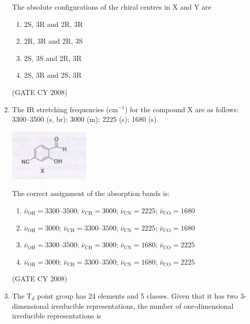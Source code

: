\documentclass[12pt]{article}
\begin{document}
\begin{enumerate}
 The absolute configurations of the chiral centres in X and Y are

\begin{enumerate}
\item  2S, 3R  and  2R, 3R 
\item  2R, 3R  and  2R, 3S 
\item  2S, 3S  and  2R, 3R 
\item  2S, 3R  and  2S, 3R
\end{enumerate}    \hfill{(GATE CY 2008)}


\item The IR stretching frequencies (cm$^{-1}$) for the compound X are as follows: 3300--3500 (s, br); 3000 (m); 2225 (s); 1680 (s). 

\begin{center}
\includegraphics[width=0.6\columnwidth]{figs/q53.png}
\end{center}

The correct assignment of the absorption bands is:

\begin{enumerate}
\item  $\bar{\nu}_{\text{OH}} = 3300$--$3500$; $\bar{\nu}_{\text{CH}} = 3000$; $\bar{\nu}_{\text{CN}} = 2225$; $\bar{\nu}_{\text{CO}} = 1680$ 
\item  $\bar{\nu}_{\text{OH}} = 3000$; $\bar{\nu}_{\text{CH}} = 3300$--$3500$; $\bar{\nu}_{\text{CN}} = 2225$; $\bar{\nu}_{\text{CO}} = 1680$ 
\item  $\bar{\nu}_{\text{OH}} = 3300$--$3500$; $\bar{\nu}_{\text{CH}} = 3000$; $\bar{\nu}_{\text{CN}} = 1680$; $\bar{\nu}_{\text{CO}} = 2225$ 
\item  $\bar{\nu}_{\text{OH}} = 3000$; $\bar{\nu}_{\text{CH}} = 3300$--$3500$; $\bar{\nu}_{\text{CN}} = 1680$; $\bar{\nu}_{\text{CO}} = 2225$
\end{enumerate}    \hfill{(GATE CY 2008)}


\item The T$_d$ point group has 24 elements and 5 classes. Given that it has two 3-dimensional irreducible representations, the number of one-dimensional irreducible representations is
\begin{enumerate}
\end{enumerate}


\end{enumerate}
\end{document}

